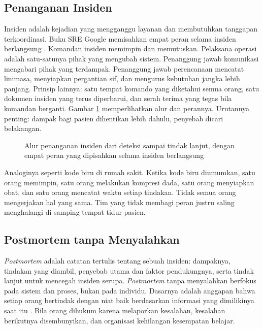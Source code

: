 \subsection{Penanganan Insiden}

Insiden adalah kejadian yang mengganggu layanan dan membutuhkan tanggapan terkoordinasi. Buku SRE
Google memisahkan empat peran selama insiden berlangsung \cite{beyer2016}. Komandan insiden
memimpin dan memutuskan. Pelaksana operasi adalah satu-satunya pihak yang mengubah sistem.
Penanggung jawab komunikasi mengabari pihak yang terdampak. Penanggung jawab perencanaan mencatat
linimasa, menyiapkan pergantian sif, dan mengurus kebutuhan jangka lebih panjang. Prinsip lainnya:
satu tempat komando yang diketahui semua orang, satu dokumen insiden yang terus diperbarui, dan
serah terima yang tegas bila komandan berganti. Gambar \ref{fig:ch11-alur-insiden} memperlihatkan
alur dan perannya. Urutannya penting: dampak bagi pasien dihentikan lebih dahulu, penyebab dicari
belakangan.

\begin{figure}[!htb]
  \centering
  
  \caption{Alur penanganan insiden dari deteksi sampai tindak lanjut, dengan empat peran yang
           dipisahkan selama insiden berlangsung}
  \label{fig:ch11-alur-insiden}
\end{figure}

Analoginya seperti kode biru di rumah sakit. Ketika kode biru diumumkan, satu orang memimpin,
satu orang melakukan kompresi dada, satu orang menyiapkan obat, dan satu orang mencatat waktu
setiap tindakan. Tidak semua orang mengerjakan hal yang sama. Tim yang tidak membagi peran justru
saling menghalangi di samping tempat tidur pasien.

\subsection{Postmortem tanpa Menyalahkan}

\textit{Postmortem} adalah catatan tertulis tentang sebuah insiden: dampaknya, tindakan yang
diambil, penyebab utama dan faktor pendukungnya, serta tindak lanjut untuk mencegah insiden serupa.
\textit{Postmortem} tanpa menyalahkan berfokus pada sistem dan proses, bukan pada individu. Dasarnya
adalah anggapan bahwa setiap orang bertindak dengan niat baik berdasarkan informasi yang dimilikinya
saat itu \cite{beyer2016}. Bila orang dihukum karena melaporkan kesalahan, kesalahan berikutnya
disembunyikan, dan organisasi kehilangan kesempatan belajar.

